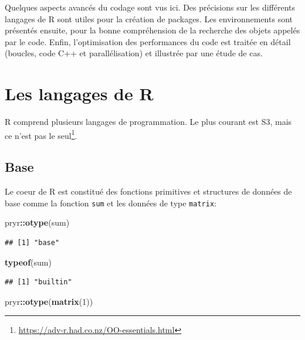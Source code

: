 \documentclass[
  12pt,
  french,
  a4paper,
  extrafontsizes,onecolumn,openright
  ]{memoir}
\newenvironment{Shaded}{\begin{snugshade}}{\end{snugshade}}
\newcommand{\DecValTok}[1]{\textcolor[rgb]{0.00,0.00,0.81}{#1}}
\newcommand{\KeywordTok}[1]{\textcolor[rgb]{0.13,0.29,0.53}{\textbf{#1}}}
\newcommand{\NormalTok}[1]{#1}
\newcommand{\OperatorTok}[1]{\textcolor[rgb]{0.81,0.36,0.00}{\textbf{#1}}}
\newlength{\rf}
\begin{document}
Quelques aspects avancés du codage sont vus ici.
Des précisions sur les différents langages de R sont utiles pour la création de packages.
Les environnements sont présentés ensuite, pour la bonne compréhension de la recherche des objets appelés par le code.
Enfin, l'optimisation des performances du code est traitée en détail (boucles, code C++ et parallélisation) et illustrée par une étude de cas.

\hypertarget{les-langages-de-r}{%
\section{Les langages de R}\label{les-langages-de-r}}

R comprend plusieurs langages de programmation.
Le plus courant est S3, mais ce n'est pas le seul\footnote{\url{https://adv-r.had.co.nz/OO-essentials.html}}.

\hypertarget{base}{%
\subsection{Base}\label{base}}

Le coeur de R est constitué des fonctions primitives et structures de données de base comme la fonction \texttt{sum} et les données de type \texttt{matrix}:

\scriptsize

\begin{Shaded}
\begin{Highlighting}[]
\NormalTok{pryr}\OperatorTok{::}\KeywordTok{otype}\NormalTok{(sum)}
\end{Highlighting}
\end{Shaded}

\begin{verbatim}
## [1] "base"
\end{verbatim}

\begin{Shaded}
\begin{Highlighting}[]
\KeywordTok{typeof}\NormalTok{(sum)}
\end{Highlighting}
\end{Shaded}

\begin{verbatim}
## [1] "builtin"
\end{verbatim}

\begin{Shaded}
\begin{Highlighting}[]
\NormalTok{pryr}\OperatorTok{::}\KeywordTok{otype}\NormalTok{(}\KeywordTok{matrix}\NormalTok{(}\DecValTok{1}\NormalTok{))}
\end{Highlighting}
\end{Shaded}
\end{document}
